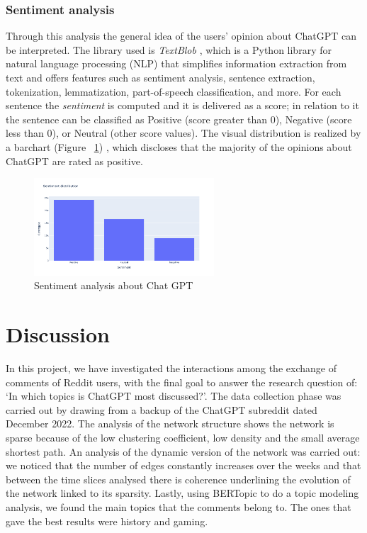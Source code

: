 \documentclass[sigchi]{acmart}
\begin{document}
\subsubsection{Sentiment analysis} Through this analysis the general idea of the users' opinion about ChatGPT can be interpreted. The library used is \textit{TextBlob} \cite{TextBlob}, which is a Python library for natural language processing (NLP) that simplifies information extraction from text and offers features such as sentiment analysis, sentence extraction, tokenization, lemmatization, part-of-speech classification, and more. For each sentence the \textit{sentiment} is computed and it is delivered as a score; in relation to it the sentence can be classified as Positive (score greater than 0), Negative (score less than 0), or Neutral (other score values). The visual distribution is realized by a barchart (Figure ~\ref{fig:immagine_sentiment}) , which discloses that the majority of the opinions about ChatGPT are rated as positive. 

\begin{figure}[H]
  \centering
  \includegraphics[width=0.6\textwidth]{sentiment.png}
  \caption{Sentiment analysis about Chat GPT}
  \label{fig:immagine_sentiment}
\end{figure}

\newpage
\section{Discussion}
In this project, we have investigated the interactions among the exchange of comments of Reddit users, with the final goal to answer the research question of: ‘In which topics is ChatGPT most discussed?'.
The data collection phase was carried out by drawing from a backup of the ChatGPT subreddit dated December 2022.
The analysis of the network structure shows the network is sparse because of the low clustering coefficient, low density and the small average shortest path.
An analysis of the dynamic version of the network was carried out: we noticed that the number of edges constantly increases over the weeks and that between the time slices analysed there is coherence underlining the evolution of the network linked to its sparsity.
Lastly, using BERTopic to do a topic modeling analysis, we found the main topics that the comments belong to. The ones that gave the best results were history and gaming.

\newpage


\end{document}
